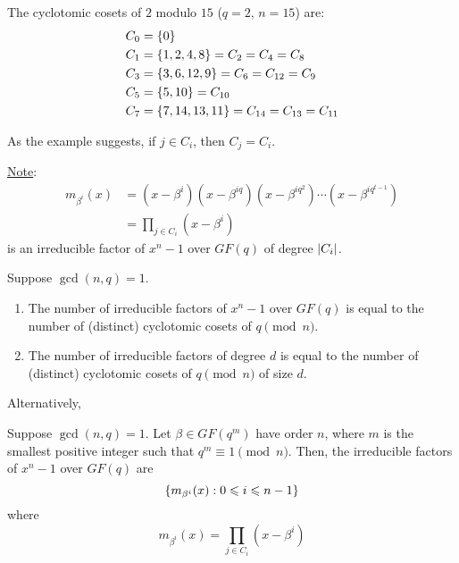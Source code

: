\begin{Example}{}{}
    The cyclotomic cosets of $ 2 $ modulo $ 15 $ ($ q=2,\,n=15 $) are:
    \begin{align*}
        C_0 & =\{0\}                               \\
        C_1 & =\{1,2,4,8\}=C_2=C_4=C_8             \\
        C_3 & =\{3,6,12,9\}=C_6=C_{12}=C_9         \\
        C_5 & =\{5,10\}=C_{10}                     \\
        C_7 & =\{7,14,13,11\}=C_{14}=C_{13}=C_{11}
    \end{align*}
\end{Example}

As the example suggests, if $ j\in C_i $, then $ C_j=C_i $.

\underline{Note}:
\begin{align*}
    m_{\beta^i}(x)
     & =(x-\beta^i)(x-\beta^{iq})(x-\beta^{iq^2})\cdots(x-\beta^{iq^{t-1}}) \\
     & =\prod_{j\in C_i}(x-\beta^i)
\end{align*}
is an irreducible factor of $ x^n-1 $ over $ GF(q) $ of degree $ \lvert C_i\rvert $.


\begin{Theorem}{}{}
    Suppose $ \gcd(n,q)=1 $.
    \begin{enumerate}[label=(\roman*)]
        \item The number of irreducible factors of $ x^n-1 $
              over $ GF(q) $ is equal to the number of (distinct)
              cyclotomic cosets of $ q\pmod{n} $.
        \item The number of irreducible factors of degree $ d $
              is equal to the number of (distinct)
              cyclotomic cosets of $ q\pmod{n} $ of size $ d $.
    \end{enumerate}
\end{Theorem}


Alternatively,

\begin{Theorem}{}{}
    Suppose $ \gcd(n,q)=1 $. Let $ \beta\in GF(q^m) $ have order
    $ n $, where $ m $ is the smallest positive integer such that
    $ q^m\equiv 1\pmod{n} $. Then, the irreducible factors of $ x^n-1 $
    over $ GF(q) $ are
    \[ \{m_{\beta^i}(x):0\leqslant i\leqslant n-1\} \]
    where
    \[ m_{\beta^i}(x)=\prod_{j\in C_i}(x-\beta^i) \]
\end{Theorem}


